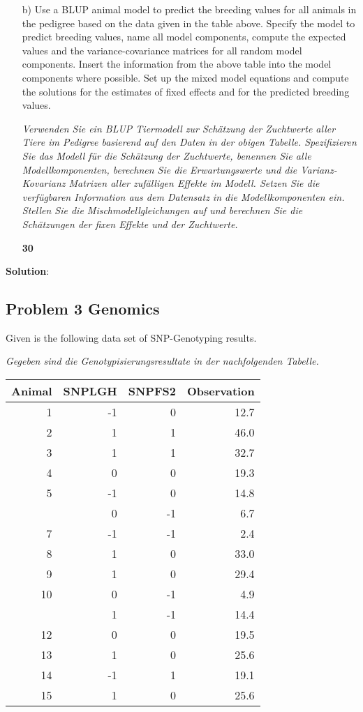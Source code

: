 \documentclass[
]{article}
\newcommand{\points}[1]
{\begin{flushright}\textbf{#1}\end{flushright}}
\newcommand{\solstart}
{\vspace{3ex}\textbf{Solution}:}
\begin{document}
\begin{enumerate}
\item[b)] Use a BLUP animal model to predict the breeding values for all animals in the pedigree based on the data given in the table above. Specify the model to predict breeding values, name all model components, compute the expected values and the variance-covariance matrices for all random model components. Insert the information from the above table into the model components where possible. Set up the mixed model equations and compute the solutions for the estimates of fixed effects and for the predicted breeding values. 

\textit{Verwenden Sie ein BLUP Tiermodell zur Schätzung der Zuchtwerte aller Tiere im Pedigree basierend auf den Daten in der obigen Tabelle. Spezifizieren Sie das Modell für die Schätzung der Zuchtwerte, benennen Sie alle Modellkomponenten, berechnen Sie die Erwartungswerte und die Varianz-Kovarianz Matrizen aller zufälligen Effekte im Modell. Setzen Sie die verfügbaren Information aus dem Datensatz in die Modellkomponenten ein. Stellen Sie die Mischmodellgleichungen auf und berechnen Sie die Schätzungen der fixen Effekte und der Zuchtwerte.}
\points{30}
\end{enumerate}

\solstart

\clearpage
\pagebreak

\hypertarget{problem-3-genomics}{%
\subsection{Problem 3 Genomics}\label{problem-3-genomics}}

Given is the following data set of SNP-Genotyping results.

\textit{Gegeben sind die Genotypisierungsresultate in der nachfolgenden Tabelle.}

\begin{tabular}{rrrr}
\toprule
Animal & SNPLGH & SNPFS2 & Observation\\
\midrule
1 & -1 & 0 & 12.7\\
2 & 1 & 1 & 46.0\\
3 & 1 & 1 & 32.7\\
4 & 0 & 0 & 19.3\\
5 & -1 & 0 & 14.8\\
\addlinespace
6 & 0 & -1 & 6.7\\
7 & -1 & -1 & 2.4\\
8 & 1 & 0 & 33.0\\
9 & 1 & 0 & 29.4\\
10 & 0 & -1 & 4.9\\
\addlinespace
11 & 1 & -1 & 14.4\\
12 & 0 & 0 & 19.5\\
13 & 1 & 0 & 25.6\\
14 & -1 & 1 & 19.1\\
15 & 1 & 0 & 25.6\\
\bottomrule
\end{tabular}
\end{document}
